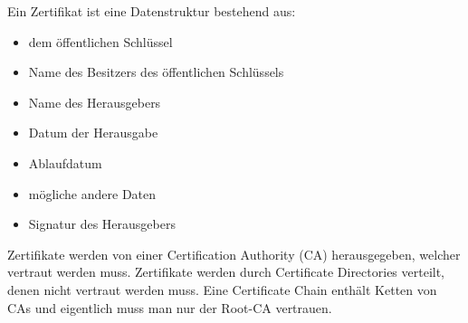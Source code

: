 Ein Zertifikat ist eine Datenstruktur bestehend aus:
\begin{itemize}
  \item dem öffentlichen Schlüssel
  \item Name des Besitzers des öffentlichen Schlüssels
  \item Name des Herausgebers
  \item Datum der Herausgabe
  \item Ablaufdatum
  \item mögliche andere Daten
  \item Signatur des Herausgebers
\end{itemize}

Zertifikate werden von einer Certification Authority (CA) herausgegeben, welcher vertraut
werden muss.
Zertifikate werden durch Certificate Directories verteilt, denen nicht vertraut werden
muss.
Eine Certificate Chain enthält Ketten von CAs und eigentlich muss man nur der Root-CA
vertrauen.
